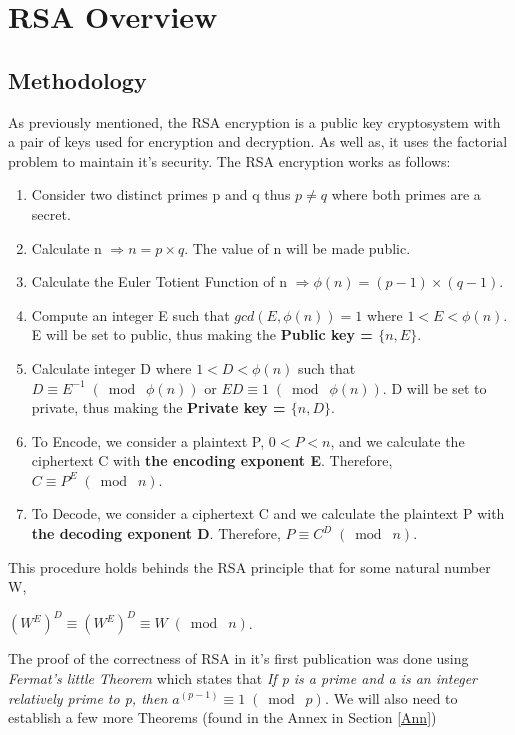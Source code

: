 \documentclass{article}
\begin{document}
\section{RSA Overview}

\subsection{Methodology}
\quad \quad As previously mentioned, the RSA encryption is a public key cryptosystem with a pair of keys used for encryption and decryption. As well as, it uses the factorial problem to maintain it's security. The RSA encryption works as follows:
\begin{enumerate}
    \item Consider two distinct primes p and q thus $p \neq q$ where both primes are a secret.
    \item Calculate n $\Longrightarrow n = p \times q$. The value of n will be made public.
    \item Calculate the Euler Totient Function of n $\Longrightarrow \phi(n) = (p-1) \times (q-1)$.
    \item Compute an integer E such that $gcd(E, \phi(n)) = 1$ where $1 < E < \phi(n)$. E will be set to public, thus making the \textbf{Public key = $\{n, E\}$}.
    \item Calculate integer D where $1 < D < \phi(n)$ such that $D \equiv E^{-1} \;(\bmod\; \phi(n))$ or $ED \equiv 1 \;(\bmod\; \phi(n))$. D will be set to private, thus making the \textbf{Private key = $\{n, D\}$}.
    \item To Encode, we consider a plaintext P, $0 < P <n$, and we calculate the ciphertext C with \textbf{the encoding exponent E}. Therefore, $C \equiv P^{E} \;(\bmod\; n)$.
    \item To Decode, we consider a ciphertext C and we calculate the plaintext P with \textbf{the decoding exponent D}. Therefore, $P \equiv C^{D} \;(\bmod\; n)$.
\end{enumerate}

This procedure holds behinds the RSA principle that for some natural number W,
\begin{center}
    $(W^E)^D \equiv (W^E)^D \equiv W \;(\bmod\; n)$.
\end{center}

The proof of the correctness of RSA in it's first publication was done using \textit{Fermat's little Theorem} which states that \textit{If p is a prime and a is an integer relatively prime to p, then $a^{(p-1)} \equiv 1 \;(\bmod\; p)$.} We will also need to establish a few more Theorems (found in the Annex in Section \ref{Ann})
\end{document}
